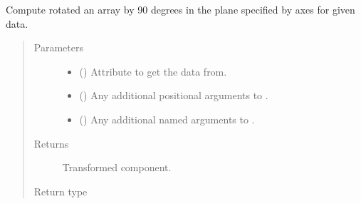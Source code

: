 \documentclass[letterpaper,10pt,english]{sphinxmanual}
\begin{document}
\begin{fulllineitems}
\begin{fulllineitems}
\label{\detokenize{api/base_classes:geology.src.base_spatial.SpatialComponent.rot90}}
Compute rotated an array by 90 degrees in the plane specified by axes for given data.
\begin{quote}\begin{description}
\item[{Parameters}] \leavevmode\begin{itemize}
\item {} 
 (\sphinxstyleliteralemphasis{\sphinxupquote{, }}) \textendash{} Attribute to get the data from.

\item {} 
 () \textendash{} Any additional positional arguments to .

\item {} 
 () \textendash{} Any additional named arguments to .

\end{itemize}

\item[{Returns}] \leavevmode
{} \textendash{} Transformed component.

\item[{Return type}] \leavevmode
{\hyperref[\detokenize{api/base_classes:geology.src.base_spatial.SpatialComponent}]{}}

\end{description}\end{quote}

\end{fulllineitems}



\end{fulllineitems}
\end{document}

